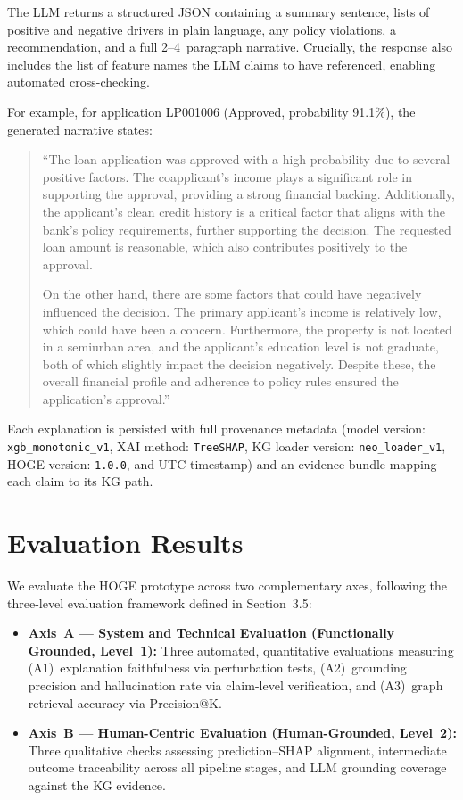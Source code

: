 \documentclass[lnbip]{svmultln}
\begin{document}
The LLM returns a structured JSON containing a summary sentence, lists of positive and negative drivers in plain language, any policy violations, a recommendation, and a full 2--4~paragraph narrative. Crucially, the response also includes the list of feature names the LLM claims to have referenced, enabling automated cross-checking.

For example, for application LP001006 (Approved, probability 91.1\%), the generated narrative states:

\begin{quote}
``The loan application was approved with a high probability due to several positive factors. The coapplicant's income plays a significant role in supporting the approval, providing a strong financial backing. Additionally, the applicant's clean credit history is a critical factor that aligns with the bank's policy requirements, further supporting the decision. The requested loan amount is reasonable, which also contributes positively to the approval.

On the other hand, there are some factors that could have negatively influenced the decision. The primary applicant's income is relatively low, which could have been a concern. Furthermore, the property is not located in a semiurban area, and the applicant's education level is not graduate, both of which slightly impact the decision negatively. Despite these, the overall financial profile and adherence to policy rules ensured the application's approval.''
\end{quote}

Each explanation is persisted with full provenance metadata (model version: \texttt{xgb\_monotonic\_v1}, XAI method: \texttt{TreeSHAP}, KG loader version: \texttt{neo\_loader\_v1}, HOGE version: \texttt{1.0.0}, and UTC timestamp) and an evidence bundle mapping each claim to its KG path.


\section{Evaluation Results}

We evaluate the HOGE prototype across two complementary axes, following the three-level evaluation framework defined in Section~3.5:

\begin{itemize}
    \item \textbf{Axis~A --- System and Technical Evaluation (Functionally Grounded, Level~1):} Three automated, quantitative evaluations measuring (A1)~explanation faithfulness via perturbation tests, (A2)~grounding precision and hallucination rate via claim-level verification, and (A3)~graph retrieval accuracy via Precision@K.
    \item \textbf{Axis~B --- Human-Centric Evaluation (Human-Grounded, Level~2):} Three qualitative checks assessing prediction--SHAP alignment, intermediate outcome traceability across all pipeline stages, and LLM grounding coverage against the KG evidence.
\end{itemize}
\end{document}

